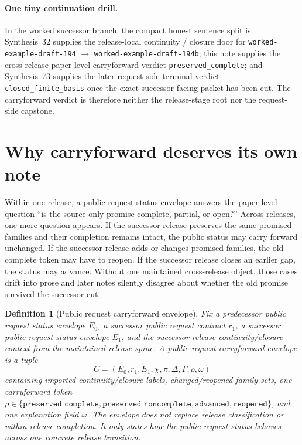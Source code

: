 \documentclass[11pt]{article}
\newtheorem{definition}{Definition}
\begin{document}
\paragraph{One tiny continuation drill.}
In the worked successor branch, the compact honest sentence split is: Synthesis~32 supplies the release-local continuity / closure floor for \texttt{worked-example-draft-194} $\to$ \texttt{worked-example-draft-194b}; this note supplies the cross-release paper-level carryforward verdict \texttt{preserved\_complete}; and Synthesis~73 supplies the later request-side terminal verdict \texttt{closed\_finite\_basis} once the exact successor-facing packet has been cut. The carryforward verdict is therefore neither the release-stage root nor the request-side capstone.\cite{series:releasespine,series:publicrequestresponsepacketrefreshresponsepacketclosureverdicts,series:workedexample}

\section{Why carryforward deserves its own note}
Within one release, a public request status envelope answers the paper-level question ``is the source-only promise complete, partial, or open?''
Across releases, one more question appears.
If the successor release preserves the same promised families and their completion remains intact, the public status may carry forward unchanged.
If the successor release adds or changes promised families, the old complete token may have to reopen.
If the successor release closes an earlier gap, the status may advance.
Without one maintained cross-release object, those cases drift into prose and later notes silently disagree about whether the old promise survived the successor cut.

\begin{definition}[Public request carryforward envelope]
Fix a predecessor public request status envelope $E_0$, a successor public request contract $r_1$, a successor public request status envelope $E_1$, and the successor-release continuity/closure context from the maintained release spine.
A \emph{public request carryforward envelope} is a tuple
\[
C=(E_0,r_1,E_1,\chi,\pi,\Delta,\Gamma,\rho,\omega)
\]
containing imported continuity/closure labels, changed/reopened-family sets, one carryforward token $\rho\in\{\texttt{preserved\_complete},\texttt{preserved\_noncomplete},\texttt{advanced},\texttt{reopened}\}$, and one explanation field $\omega$.
The envelope does not replace release classification or within-release completion.
It only states how the public request status behaves across one concrete release transition.
\end{definition}
\end{document}
